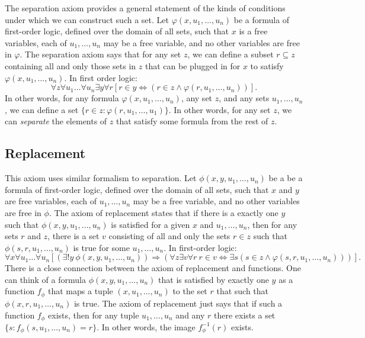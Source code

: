 \documentclass[11pt]{article}
\theoremstyle{definition}
\theoremstyle{remark}
\begin{document}
The separation axiom provides a general statement of the kinds of conditions under which we can construct such a set. Let $\varphi(x,u_{1},\dots,u_{n})$ be a formula of first-order logic, defined over the domain of all sets, such that $x$ is a free variables, each of $u_{1},\dots,u_{n}$ may be a free variable, and no other variables are free in $\varphi$. The separation axiom says that for any set $z$, we can define a subset $r\subseteq z$ containing all and only those sets in $z$ that can be plugged in for $x$ to satisfy $\varphi(x,u_{1},\dots,u_{n})$. In first order logic:
$$\forall z\forall u_{1}\dots\forall u_{n}\exists y \forall r \left[r\in y \iff \left(r\in z \wedge \varphi(r,u_{1},\dots,u_{n}) \right) \right].$$
In other words, for any formula $\varphi(x,u_{1},\dots,u_{n})$, any set $z$, and any sets $u_{1},\dots,u_{n}$, we can define a set $\{r\in z : \varphi(r,u_{1},\dots,u_{1})\}$. In other words, for any set $z$, we can \textit{separate} the elements of $z$ that satisfy some formula from the rest of $z$. 

\subsection{Replacement}
This axiom uses similar formalism to separation. Let $\phi(x,y,u_{1},\dots,u_{n})$ be a be a formula of first-order logic, defined over the domain of all sets, such that $x$ and $y$ are free variables, each of $u_{1},\dots,u_{n}$ may be a free variable, and no other variables are free in $\phi$. The axiom of replacement states that if there is a exactly one $y$ such that $\phi(x,y,u_{1},\dots,u_{n})$ is satisfied for a given $x$ and $u_{1},\dots,u_{n}$, then for any sets $r$ and $z$, there is a set $v$ consisting of all and only the sets $r\in z$ such that $\phi(s,r,u_{1},\dots,u_{n})$ is true for some $u_{1},\dots,u_{n}$. In first-order logic:
$$\forall x\forall u_{1}\dots\forall u_{n}\left[\left(\exists!y \ \phi(x,y,u_{1},\dots,u_{n})\right)\Rightarrow \left(\forall z \exists v \forall r \ r\in v \iff \exists s (s\in z \wedge \varphi(s,r,u_{1},\dots,u_{n}))\right) \right].$$
There is a close connection between the axiom of replacement and functions. One can think of a formula $\phi(x,y,u_{1},\dots,u_{n})$ that is satisfied by exactly one $y$ as a function $f_{\phi}$ that maps a tuple $(x,u_{1},\dots,u_{n})$ to the set $r$ that such that $\phi(x,r,u_{1},\dots,u_{n})$ is true. The axiom of replacement just says that if such a function $f_{\phi}$ exists, then for any tuple $u_{1},\dots,u_{n}$ and any $r$ there exists a set $\{s:f_{\phi}(s,u_{1},\dots,u_{n})=r\}$. In other words, the image $f^{-1}_{\phi}(r)$ exists.\par 
\end{document}
